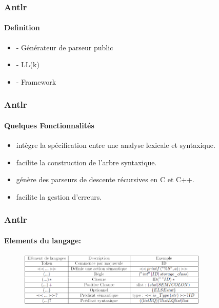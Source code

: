 \documentclass{beamer}
\begin{document}
	\begin{frame}
	\frametitle{Antlr}\framesubtitle{Definition}
 \begin{itemize}
			\item - Générateur de parseur public
			\item - LL(k)
			\item - Framework
			
\end{itemize}
\end{frame} 



		\begin{frame}
	\frametitle{Antlr}\framesubtitle{Quelques Fonctionnalités}
 \begin{itemize}
			\item intègre la spécification entre une analyse lexicale et syntaxique.
			\item facilite la construction de l’arbre syntaxique.
			\item génère des parseurs de descente récursives en C et C++.
			\item facilite la gestion d’erreurs.	
\end{itemize}
\end{frame} 


\begin{frame}
	\frametitle{Antlr}\framesubtitle{Elements du langage:}
	
\begin{figure}[h]
	\centering
		\includegraphics[width=0.80\textwidth]{tabantlr.png}
	\label{fig:tabantlr}
\end{figure}
\end{frame} 
\end{document}
